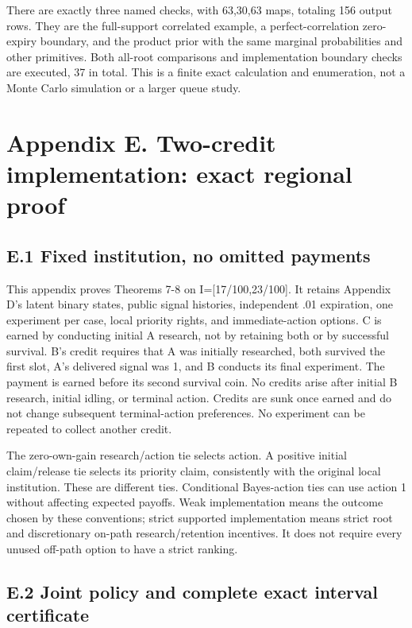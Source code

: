\documentclass[
  11pt,
]{article}
\begin{document}
There are exactly three named checks, with 63,30,63 maps, totaling 156
output rows. They are the full-support correlated example, a
perfect-correlation zero-expiry boundary, and the product prior with the
same marginal probabilities and other primitives. Both all-root
comparisons and implementation boundary checks are executed, 37 in
total. This is a finite exact calculation and enumeration, not a Monte
Carlo simulation or a larger queue study.

\section{Appendix E. Two-credit implementation: exact regional
proof}\label{appendix-e.-two-credit-implementation-exact-regional-proof}

\subsection{E.1 Fixed institution, no omitted
payments}\label{e.1-fixed-institution-no-omitted-payments}

This appendix proves Theorems 7-8 on I={[}17/100,23/100{]}. It retains
Appendix D's latent binary states, public signal histories, independent
.01 expiration, one experiment per case, local priority rights, and
immediate-action options. C is earned by conducting initial A research,
not by retaining both or by successful survival. B's credit requires
that A was initially researched, both survived the first slot, A's
delivered signal was 1, and B conducts its final experiment. The payment
is earned before its second survival coin. No credits arise after
initial B research, initial idling, or terminal action. Credits are sunk
once earned and do not change subsequent terminal-action preferences. No
experiment can be repeated to collect another credit.

The zero-own-gain research/action tie selects action. A positive initial
claim/release tie selects its priority claim, consistently with the
original local institution. These are different ties. Conditional
Bayes-action ties can use action 1 without affecting expected payoffs.
Weak implementation means the outcome chosen by these conventions;
strict supported implementation means strict root and discretionary
on-path research/retention incentives. It does not require every unused
off-path option to have a strict ranking.

\subsection{E.2 Joint policy and complete exact interval
certificate}\label{e.2-joint-policy-and-complete-exact-interval-certificate}
\end{document}
